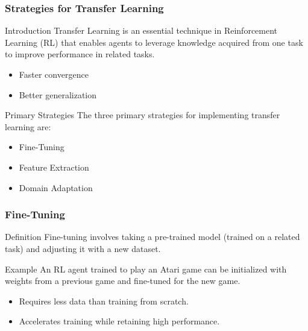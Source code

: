\documentclass[aspectratio=169]{beamer}
\begin{document}
\begin{frame}[fragile]
  \frametitle{Strategies for Transfer Learning}
  
  \begin{block}{Introduction}
    Transfer Learning is an essential technique in Reinforcement Learning (RL) that enables agents to leverage knowledge acquired from one task to improve performance in related tasks. 
    \begin{itemize}
      \item Faster convergence
      \item Better generalization
    \end{itemize}
  \end{block}
  
  \begin{block}{Primary Strategies}
    The three primary strategies for implementing transfer learning are:
    \begin{itemize}
      \item Fine-Tuning
      \item Feature Extraction
      \item Domain Adaptation
    \end{itemize}
  \end{block}
\end{frame}

\begin{frame}[fragile]
  \frametitle{Fine-Tuning}
  
  \begin{block}{Definition}
    Fine-tuning involves taking a pre-trained model (trained on a related task) and adjusting it with a new dataset.
  \end{block}

  \begin{block}{Example}
    An RL agent trained to play an Atari game can be initialized with weights from a previous game and fine-tuned for the new game.
  \end{block}
  
  \begin{itemize}
    \item Requires less data than training from scratch.
    \item Accelerates training while retaining high performance.
  \end{itemize}
\end{frame}
\end{document}
